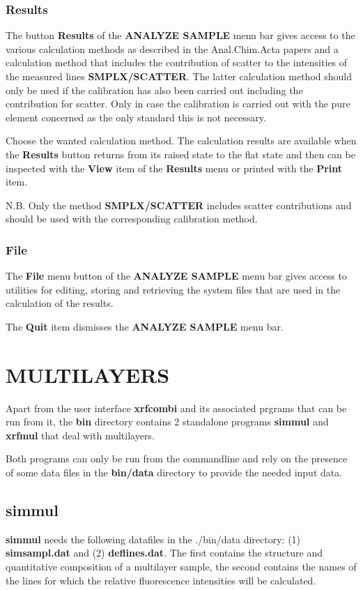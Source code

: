 \subsubsection{Results}
The button {\bf Results} of the {\bf ANALYZE SAMPLE} menu bar gives access
to the various calculation methods as described in the Anal.Chim.Acta papers
and a calculation method that includes the contribution of scatter to
the intensities of the measured lines {\bf SMPLX/SCATTER}.
The latter calculation method  should only be used if the 
calibration has also been carried out including the contribution
for scatter. Only in case the calibration is carried out with the pure
element concerned as the only standard this is not necessary.

Choose the wanted calculation
method. The calculation results are available when the {\bf Results}
button returns from its raised state to the flat state and then can
be inspected with the {\bf View} item of the {\bf Results} menu
or printed with the {\bf Print} item.

N.B. Only the method {\bf SMPLX/SCATTER} includes scatter contributions and
should be used with the corresponding calibration method.


\subsubsection{File}
The {\bf File} menu button of the {\bf ANALYZE SAMPLE} menu bar
gives access to  utilities for editing, storing and retrieving
the system files that are used in the calculation of the results.

The {\bf Quit} item dismisses the {\bf ANALYZE SAMPLE} menu bar.
 
\section{MULTILAYERS}
 
Apart from the user interface {\bf xrfcombi} and its associated prgrams
that can be run from it, the {\bf bin} directory contains 2 standalone programs
{\bf simmul} and {\bf xrfmul} that deal with multilayers.

Both programs can only be run from the commandline and rely on the
presence of some data files in the {\bf bin/data } directory to provide 
the needed input data.
\subsection{simmul}
{\bf simmul} needs the following datafiles
in the ./bin/data directory:  (1) {\bf simsampl.dat} and (2) 
{\bf deflines.dat}. The first contains the structure and quantitative
composition of a multilayer sample, the second contains the names of the 
lines for which the relative fluorescence intensities will be calculated.

